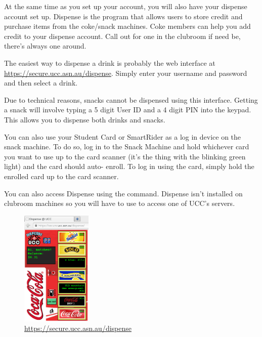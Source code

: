

At the same time as you set up your account, you will also have your dispense account set up. Dispense is the program that allows users to store credit and purchase items from the coke/snack machines. Coke members can help you add credit to your dispense account. Call out for one in the clubroom if need be, there's always one around.


The easiest way to dispense a drink is probably the web interface at \url{https://secure.ucc.asn.au/dispense}. Simply enter your username and password and then select a drink. 

Due to technical reasons, snacks cannot be dispensed using this interface. Getting a snack will involve typing a 5 digit User ID and a 4 digit PIN into the keypad. This allows you to dispense both drinks and snacks.

You can also use your Student Card or SmartRider as a log in device on the snack machine. To do so, log in to the Snack Machine and hold whichever card you want to use up to the card scanner (it's the thing with the blinking green light) and the card should auto- enroll. To log in using the card, simply hold the enrolled card up to the card scanner.


You can also access Dispense using the  command. Dispense isn't installed on clubroom machines so you will have to use  to access one of UCC's servers.




\begin{figure}[H]
	\centering
	\includegraphics[width=0.3\textwidth]{figures/webdispense.png}
	\caption{\url{https://secure.ucc.asn.au/dispense}} 
	\label{webdispense.png}
\end{figure}
